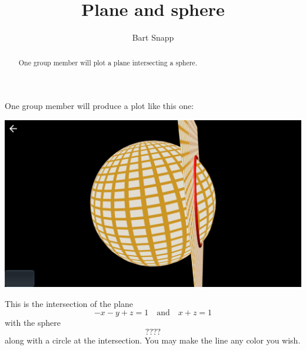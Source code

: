 \documentclass{ximera}
\author{Bart Snapp}
\title{Plane and sphere}
\begin{document}
\begin{abstract}
  One group member will plot a plane intersecting a sphere.
\end{abstract}
\maketitle

One group member will produce a plot like this one:
\begin{image}
  \includegraphics{planeAndSphere.png}
\end{image}

This is the intersection of the plane
\[
-x-y+z=1\quad\text{and}\quad  x+z=1
\]
with the sphere
\[
????
\]
along with a circle at the intersection. You may make the line any
color you wish.
\end{document}
